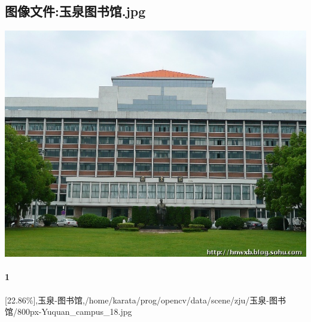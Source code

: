 \subsection{图像文件:玉泉图书馆.jpg}
\includegraphics[width=15cm,angle=0]{玉泉图书馆.jpg}

\paragraph{1}
[22.86\%],玉泉-图书馆,/home/karata/prog/opencv/data/scene/zju/玉泉-图书馆/800px-Yuquan_campus_18.jpg

